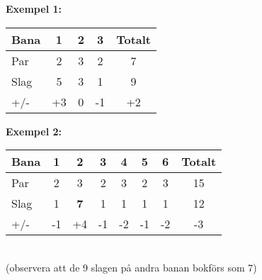 \begin{figure}[!htb]
{\bf Exempel 1:}\\
\begin{tabular}{||l|c|c|c||c||}\hline \hline
Bana & 1 & 2 & 3 & Totalt \\ \hline \hline
Par & 2 & 3 & 2 & 7 \\ \hline 
Slag & 5 & 3 & 1 & 9 \\ \hline
+/- & +3 & 0 & -1 & +2 \\ \hline \hline
\end{tabular}
\endminipage\hfill
{}
{\bf Exempel 2:}\\
\begin{tabular}{||l|c|c|c|c|c|c||c||}\hline \hline
Bana & 1 & 2 & 3 & 4 & 5 & 6 & Totalt \\ \hline \hline
Par & 2 & 3 & 2 & 3 & 2 & 3 & 15 \\ \hline 
Slag & 1 & {\bf 7} & 1 & 1 & 1 & 1 & 12 \\ \hline
+/- & -1 & +4 & -1 & -2 & -1 & -2 & -3\\ \hline \hline
\end{tabular}\\
(observera att de 9 slagen på andra banan bokförs som 7)
\endminipage\hfill
\end{figure}
